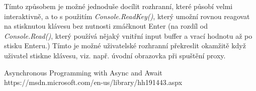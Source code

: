 \documentclass{article}
\begin{document}
Tímto způsobem je možné jednoduše docílit rozhranní, které působí velmi interaktivně, a to s použitím \emph{Console.ReadKey()}, který umožní rovnou reagovat na stisknutou klávesu bez nutnosti zmáčknout Enter (na rozdíl od \emph{Console.Read()}, který používá nějaký vnitřní input buffer a vrací hodnotu až po stisku Enteru.) Tímto je možné uživatelské rozhranní překreslit okamžitě když uživatel stiskne klávesu, viz. např. úvodní obrazovka při spuštění proxy.

\begin{thebibliography}{100}
	 Asynchronous Programming with Async and Await https://msdn.microsoft.com/en-us/library/hh191443.aspx
\end{thebibliography}
\end{document}

